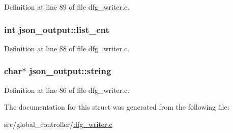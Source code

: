 Definition at line 89 of file dfg\-\_\-writer.\-c.

\hypertarget{structjson__output_a848b0ad7bd9b43c68e4840546dd4af85}{
\subsubsection[{list\-\_\-cnt}]{\setlength{\rightskip}{0pt plus 5cm}int json\-\_\-output\-::list\-\_\-cnt}}\label{structjson__output_a848b0ad7bd9b43c68e4840546dd4af85}


Definition at line 88 of file dfg\-\_\-writer.\-c.

\hypertarget{structjson__output_ab23f3314108564454074ebea87112800}{
\subsubsection[{string}]{\setlength{\rightskip}{0pt plus 5cm}char$\ast$ json\-\_\-output\-::string}}\label{structjson__output_ab23f3314108564454074ebea87112800}


Definition at line 86 of file dfg\-\_\-writer.\-c.



The documentation for this struct was generated from the following file\-:\begin{DoxyCompactItemize}
\item 
src/global\-\_\-controller/\hyperlink{dfg__writer_8c}{dfg\-\_\-writer.\-c}\end{DoxyCompactItemize}
